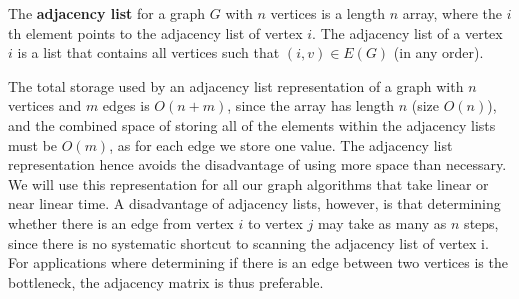 \documentclass{article}
\begin{document}
The \textbf{adjacency list} for a graph $G$ with $n$ vertices is a length $n$ array, where the $i$th element points to the adjacency list of vertex $i$. The adjacency list of a vertex $i$ is a list that contains all vertices such that $(i, v) \in E(G)$ (in any order). 

The total storage used by an adjacency list representation of a graph with $n$ vertices and $m$ edges is $O(n+m)$, since the array has length $n$ (size $O(n)$), and the combined space of storing all of the elements within the adjacency lists must be $O(m)$, as for each edge we store one value. The adjacency list representation hence avoids the disadvantage of using more space than necessary. We will use this representation for all our graph algorithms that take linear or near linear time. A disadvantage of adjacency lists, however, is that determining whether there is an edge from vertex $i$ to vertex $j$ may take as many as $n$ steps, since there is no systematic shortcut to scanning the adjacency list of vertex i. For applications where determining if there is an edge between two vertices is the bottleneck, the adjacency matrix is thus preferable.
\end{document}
